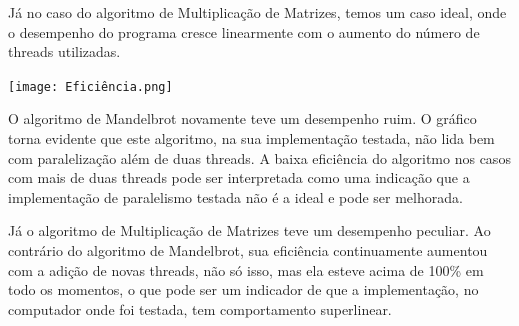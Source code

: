 \documentclass[10pt,a4paper]{article}
\begin{document}
		Já no caso do algoritmo de Multiplicação de Matrizes, temos um caso ideal, onde o desempenho do programa cresce linearmente
		com o aumento do número de threads utilizadas.

		\texttt{[image: Eficiência.png]}
		
		O algoritmo de Mandelbrot novamente teve um desempenho ruim. O gráfico torna evidente
		que este algoritmo, na sua implementação testada, não lida bem com paralelização além de duas threads.
		A baixa eficiência do algoritmo nos casos com mais de duas threads pode ser interpretada como uma indicação que
		a implementação de paralelismo testada não é a ideal e pode ser melhorada.

		Já o algoritmo de Multiplicação de Matrizes teve um desempenho peculiar. Ao contrário do algoritmo de Mandelbrot, sua
		eficiência continuamente aumentou com a adição de novas threads, não só isso, mas ela esteve acima de 100\% em todo os
		momentos, o que pode ser um indicador de que a implementação, no computador onde foi testada, tem comportamento superlinear.
\end{document}
